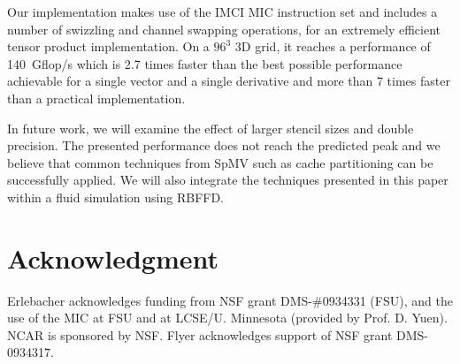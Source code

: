 \documentclass{sig-alternate}
\begin{document}
Our implementation makes use of the IMCI MIC instruction set and
includes a number of swizzling and channel swapping operations, for an
extremely efficient tensor product implementation. On a $96^3$ 3D
grid, it reaches a performance of 140~Gflop/s which is 2.7 times
faster than the best possible performance achievable for a single
vector and a single derivative and more than 7 times faster than a
practical implementation.

In future work, we will examine the effect of larger stencil sizes and
double precision. The presented performance does not reach the predicted
peak and we believe that common techniques from SpMV such as cache
partitioning can be successfully applied. We will also integrate the
techniques presented in this paper within a fluid simulation using
RBFFD.

\section*{Acknowledgment}
Erlebacher acknowledges funding from NSF grant
DMS-\#0934331 (FSU), and the use of the MIC at FSU and at LCSE/U. Minnesota (provided by Prof. D. Yuen). NCAR is sponsored by NSF. 
Flyer acknowledges support of NSF grant DMS-0934317.



\end{document}
